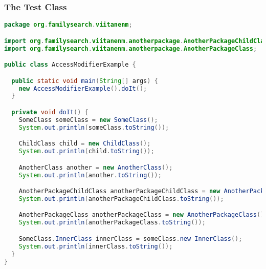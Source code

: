 \subsubsection{The Test Class}\label{App:AppendixKTest}
\begin{lstlisting}[language=Java]
package org.familysearch.viitanenm;

import org.familysearch.viitanenm.anotherpackage.AnotherPackageChildClass;
import org.familysearch.viitanenm.anotherpackage.AnotherPackageClass;

public class AccessModifierExample {

  public static void main(String[] args) {
    new AccessModifierExample().doIt();
  }

  private void doIt() {
    SomeClass someClass = new SomeClass();
    System.out.println(someClass.toString());

    ChildClass child = new ChildClass();
    System.out.println(child.toString());

    AnotherClass another = new AnotherClass();
    System.out.println(another.toString());

    AnotherPackageChildClass anotherPackageChildClass = new AnotherPackageChildClass();
    System.out.println(anotherPackageChildClass.toString());

    AnotherPackageClass anotherPackageClass = new AnotherPackageClass();
    System.out.println(anotherPackageClass.toString());

    SomeClass.InnerClass innerClass = someClass.new InnerClass();
    System.out.println(innerClass.toString());
  }
}
\end{lstlisting}

